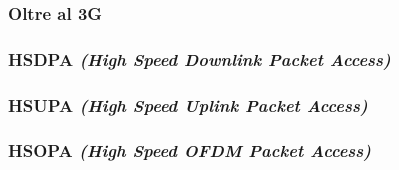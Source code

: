\subsubsection{Oltre al 3G}

\subsubsection*{HSDPA \textit{(High Speed Downlink Packet Access)}}

\subsubsection*{HSUPA \textit{(High Speed Uplink Packet Access)}}

\subsubsection*{HSOPA \textit{(High Speed OFDM Packet Access)}}

\newpage